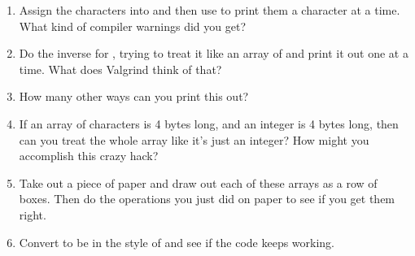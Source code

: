 \begin{enumerate}
\item Assign the characters into  and then use 
    to print them a character at a time.  What kind of compiler warnings 
    did you get?
\item Do the inverse for , trying to treat it like an array
    of  and print it out one  at a time.  What
    does Valgrind think of that?
\item How many other ways can you print this out?
\item If an array of characters is 4 bytes long, and an integer is 4 bytes
    long, then can you treat the whole  array like it's just
    an integer?  How might you accomplish this crazy hack?
\item Take out a piece of paper and draw out each of these arrays as a
    row of boxes. Then do the operations you just did on paper to see
    if you get them right.
\item Convert  to be in the style of  and see
    if the code keeps working.
\end{enumerate}



